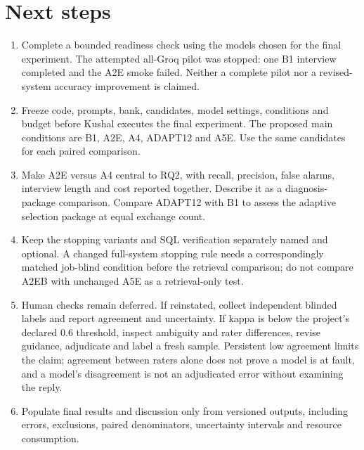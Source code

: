 \documentclass[11pt,a4paper]{article}
\begin{document}
\section{Next steps}
\label{sec:next}
\begin{enumerate}
  \item Complete a bounded readiness check using the models chosen for the final experiment.
  The attempted all-Groq pilot was stopped: one B1 interview completed and the A2E smoke failed.
  Neither a complete pilot nor a revised-system accuracy improvement is claimed.
  \item Freeze code, prompts, bank, candidates, model settings, conditions and budget before
  Kushal executes the final experiment. The proposed main conditions are B1, A2E, A4,
  ADAPT12 and A5E. Use the same candidates for each paired comparison.
  \item Make A2E versus A4 central to RQ2, with recall, precision, false alarms, interview
  length and cost reported together. Describe it as a diagnosis-package comparison.
  Compare ADAPT12 with B1 to assess the adaptive selection package at equal exchange count.
  \item Keep the stopping variants and SQL verification separately named and optional.
  A changed full-system stopping rule needs a correspondingly matched job-blind condition
  before the retrieval comparison; do not compare A2EB with unchanged A5E as a retrieval-only test.
  \item Human checks remain deferred. If reinstated, collect independent blinded labels and
  report agreement and uncertainty. If kappa is below the project's declared 0.6 threshold,
  inspect ambiguity and rater differences, revise guidance, adjudicate and label a fresh sample.
  Persistent low agreement limits the claim; agreement between raters alone does not prove a model
  is at fault, and a model's disagreement is not an adjudicated error without examining the reply.
  \item Populate final results and discussion only from versioned outputs, including errors,
  exclusions, paired denominators, uncertainty intervals and resource consumption.
\end{enumerate}
\end{document}
